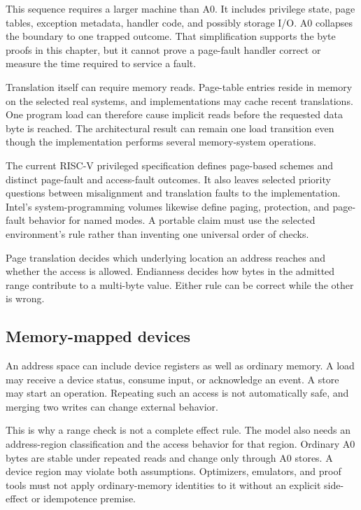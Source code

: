 This sequence requires a larger machine than A0. It includes privilege state,
page tables, exception metadata, handler code, and possibly storage I/O. A0
collapses the boundary to one trapped outcome. That simplification supports
the byte proofs in this chapter, but it cannot prove a page-fault handler
correct or measure the time required to service a fault.

Translation itself can require memory reads. Page-table entries reside in
memory on the selected real systems, and implementations may cache recent
translations. One program load can therefore cause implicit reads before the
requested data byte is reached. The architectural result can remain one load
transition even though the implementation performs several memory-system
operations.

The current RISC-V privileged specification defines page-based schemes and
distinct page-fault and access-fault outcomes. It also leaves selected priority
questions between misalignment and translation faults to the implementation.
Intel's system-programming volumes likewise define paging, protection, and
page-fault behavior for named modes. A portable claim must use the selected
environment's rule rather than inventing one universal order of checks.
\autocite{riscv2026priv,intel2026sdm3}

\begin{warning}[title={Translation is not byte interpretation}]
Page translation decides which underlying location an address reaches and
whether the access is allowed. Endianness decides how bytes in the admitted
range contribute to a multi-byte value. Either rule can be correct while the
other is wrong.
\end{warning}

\subsection{Memory-mapped devices}

An address space can include device registers as well as ordinary memory. A
load may receive a device status, consume input, or acknowledge an event. A
store may start an operation. Repeating such an access is not automatically
safe, and merging two writes can change external behavior.

This is why a range check is not a complete effect rule. The model also needs
an address-region classification and the access behavior for that region.
Ordinary A0 bytes are stable under repeated reads and change only through A0
stores. A device region may violate both assumptions. Optimizers, emulators,
and proof tools must not apply ordinary-memory identities to it without an
explicit side-effect or idempotence premise.

